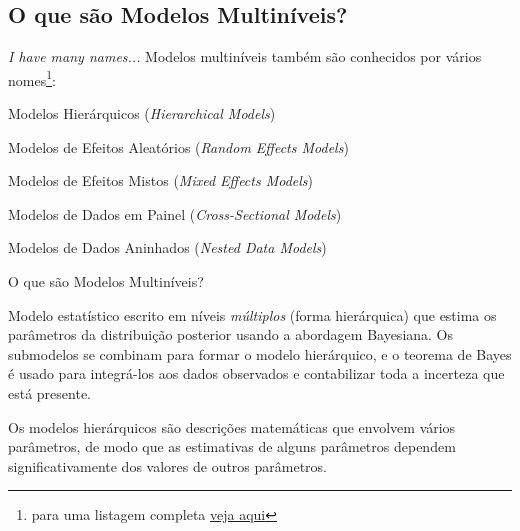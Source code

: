 \subsection{O que são Modelos Multiníveis?}
\begin{frame}{\textit{I have many names...}}
    Modelos multiníveis também são conhecidos por vários nomes\footnote{para uma listagem completa \href{https://statmodeling.stat.columbia.edu/2019/09/18/all-the-names-for-hierarchical-and-multilevel-modeling/}{veja aqui}}:
    \begin{vfilleditems}
        \item Modelos Hierárquicos (\textit{Hierarchical Models})
        \item Modelos de Efeitos Aleatórios (\textit{Random Effects Models})
        \item Modelos de Efeitos Mistos (\textit{Mixed Effects Models})
        \item Modelos de Dados em Painel (\textit{Cross-Sectional Models})
        \item Modelos de Dados Aninhados (\textit{Nested Data Models})
    \end{vfilleditems}
\end{frame}

\begin{frame}{O que são Modelos Multiníveis?}
    \begin{defn}
        Modelo estatístico escrito em níveis \textit{múltiplos} (forma hierárquica)
        que estima os parâmetros da distribuição posterior usando a abordagem
        Bayesiana. Os submodelos se combinam para formar o modelo hierárquico, e o
        teorema de Bayes é usado para integrá-los aos dados observados e contabilizar
        toda a incerteza que está presente.
    \end{defn}
    \vfill
    Os modelos hierárquicos são descrições matemáticas que envolvem vários parâmetros,
    de modo que as estimativas de alguns parâmetros dependem significativamente
    dos valores de outros parâmetros.
\end{frame}

